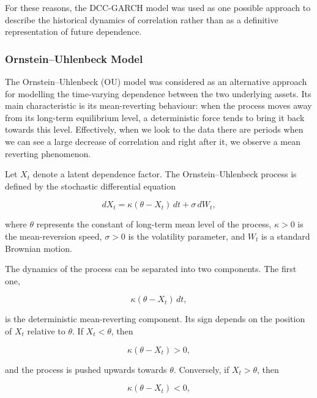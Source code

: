 \documentclass{article}
\begin{document}
For these reasons, the DCC-GARCH model was used as one possible
approach to describe the historical dynamics of correlation rather
than as a definitive representation of future dependence.

\subsubsection{Ornstein--Uhlenbeck Model}

The Ornstein--Uhlenbeck (OU) model was considered as an alternative
approach for modelling the time-varying dependence between the two
underlying assets. Its main characteristic is its mean-reverting
behaviour: when the process moves away from its long-term equilibrium
level, a deterministic force tends to bring it back towards this
level.  Effectively, when we look to the data there are periods when we can see a large decrease of correlation and right after it, we observe a mean reverting phenomenon.

Let $X_t$ denote a latent dependence factor. The Ornstein--Uhlenbeck
process is defined by the stochastic differential equation

\begin{equation}
dX_t
=
\kappa(\theta-X_t)\,dt
+
\sigma\,dW_t,
\end{equation}

where $\theta$ represents the constant of long-term mean level of the process,
$\kappa>0$ is the mean-reversion speed, $\sigma>0$ is the volatility
parameter, and $W_t$ is a standard Brownian motion.

The dynamics of the process can be separated into two components.
The first one,

\begin{equation}
\kappa(\theta-X_t)\,dt,
\end{equation}

is the deterministic mean-reverting component. Its sign depends on
the position of $X_t$ relative to $\theta$. If $X_t<\theta$, then

\begin{equation}
\kappa(\theta-X_t)>0,
\end{equation}

and the process is pushed upwards towards $\theta$. Conversely, if
$X_t>\theta$, then

\begin{equation}
\kappa(\theta-X_t)<0,
\end{equation}
\end{document}

